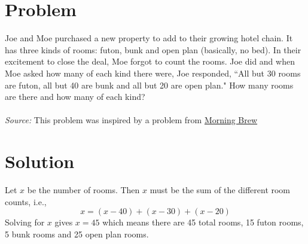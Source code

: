 \documentclass[11pt,a4paper]{report}
\theoremstyle{plain}
\theoremstyle{definition}
\theoremstyle{remark}
\begin{document}
\section*{Problem}
Joe and Moe purchased a new property to add to their growing hotel chain.  It has three kinds of rooms:  futon, bunk and open plan (basically, no bed).  In their excitement to close the deal, Moe forgot to count the rooms.  Joe did and when Moe asked how many of each kind there were, Joe responded, ``All but 30 rooms are futon, all but 40 are bunk and all but 20 are open plan."  How many rooms are there and how many of each kind?
\\
\\
\textit{Source:} This problem was inspired by a problem from \href{https://www.morningbrew.com}{Morning Brew}

\section*{Solution}
Let $x$ be the number of rooms.  Then $x$ must be the sum of the different room counts, i.e., 
$$x = (x - 40) + (x -30) + (x - 20)$$
Solving for $x$ gives $x = 45$ which means there are 45 total rooms, 15 futon rooms, 5 bunk rooms and 25 open plan rooms.

 
\end{document}
